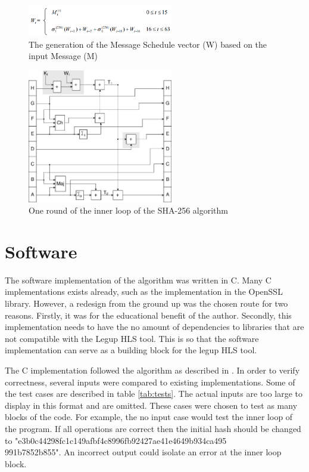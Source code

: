 \documentclass[conference]{IEEEtran}
\begin{document}
\begin{figure}[!t]
\centering
\includegraphics[width=2.5in]{messageSchedule}
\caption{The generation of the Message Schedule vector (W) based on the input Message (M)}
\label{fig:messageSchedule}
\end{figure}

\begin{figure}[!t]
\centering
\includegraphics[width=2.5in]{sha2round}
\caption{One round of the inner loop of the SHA-256 algorithm}
\label{fig:innerloop}
\end{figure}


\section{Software} \label{Software}
The software implementation of the algorithm was written in C. Many C implementations exists already, such as the implementation in the OpenSSL library. However, a redesign from the ground up was the chosen route for two reasons. Firstly, it was for the educational benefit of the author. Secondly, this implementation needs to have the no amount of dependencies to libraries that are not compatible with the Legup HLS tool. This is so that the software implementation can serve as a building block for the legup HLS tool. 

The C implementation followed the algorithm as described in \cite{nist}. In order to verify correctness, several inputs were compared to existing implementations. Some of the test cases are described in table \ref{tab:tests}. The actual inputs are too large to display in this format and are omitted. These cases were chosen to test as many blocks of the code. For example, the no input case would test the inner loop of the program. If all operations are correct then the initial hash should be changed to "e3b0c44298fc1c149afbf4c8996fb92427ae41e4649b934ca495\\991b7852b855". An incorrect output could isolate an error at the inner loop block. 
\end{document}
